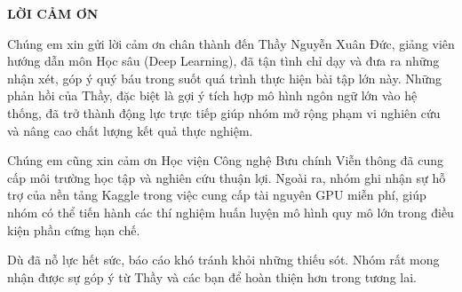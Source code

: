 \documentclass[../BTL.tex]{subfiles}
\begin{document}
\setlength{\parindent}{2em}

\begin{center}
    \Large{\textbf{LỜI CẢM ƠN}}\\
\end{center}
\vspace{1cm}

Chúng em xin gửi lời cảm ơn chân thành đến Thầy Nguyễn Xuân Đức, giảng viên hướng dẫn môn Học sâu (Deep Learning), đã tận tình chỉ dạy và đưa ra những nhận xét, góp ý quý báu trong suốt quá trình thực hiện bài tập lớn này. Những phản hồi của Thầy, đặc biệt là gợi ý tích hợp mô hình ngôn ngữ lớn vào hệ thống, đã trở thành động lực trực tiếp giúp nhóm mở rộng phạm vi nghiên cứu và nâng cao chất lượng kết quả thực nghiệm.

Chúng em cũng xin cảm ơn Học viện Công nghệ Bưu chính Viễn thông đã cung cấp môi trường học tập và nghiên cứu thuận lợi. Ngoài ra, nhóm ghi nhận sự hỗ trợ của nền tảng Kaggle trong việc cung cấp tài nguyên GPU miễn phí, giúp nhóm có thể tiến hành các thí nghiệm huấn luyện mô hình quy mô lớn trong điều kiện phần cứng hạn chế.

Dù đã nỗ lực hết sức, báo cáo khó tránh khỏi những thiếu sót. Nhóm rất mong nhận được sự góp ý từ Thầy và các bạn để hoàn thiện hơn trong tương lai.
\end{document}
